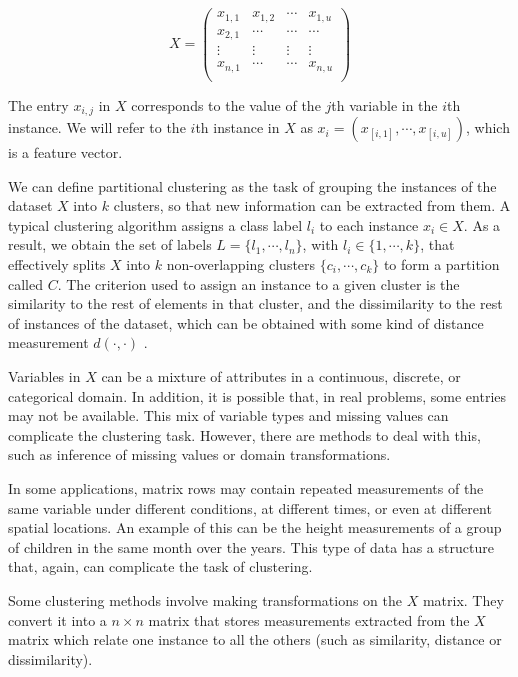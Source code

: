 $$ X = \left( \begin{array}{cccc}

x_{1,1} & x_{1,2} & \cdots & x_{1,u} \\

x_{2,1} & \cdots & \cdots & \cdots  \\

\vdots & \vdots & \vdots & \vdots \\

x_{n,1} & \cdots & \cdots & x_{n,u} \\

\end{array} \right) $$

The entry $x_{i,j}$ in $X$ corresponds to the value of the $j$th variable in the $i$th instance. We will refer to the $i$th instance in $X$ as $x_i = (x_{[i,1]}, \cdots, x_{[i,u]})$, which is a feature vector.

We can define partitional clustering as the task of grouping the instances of the dataset $X$ into $k$ clusters, so that new information can be extracted from them. A typical clustering algorithm assigns a class label $l_i$ to each instance $x_i \in X$. As a result, we obtain the set of labels $L = \{l_1, \cdots, l_n\}$, with $l_i \in \{1, \cdots, k\}$, that effectively splits $X$ into $k$ non-overlapping clusters $\{c_i, \cdots, c_k\}$ to form a partition called $C$. The criterion used to assign an instance to a given cluster is the similarity to the rest of elements in that cluster, and the dissimilarity to the rest of instances of the dataset, which can be obtained with some kind of distance measurement $d(\cdot,\cdot)$ \cite{jain1999data}.

Variables in $X$ can be a mixture of attributes in a continuous, discrete, or categorical domain. In addition, it is possible that, in real problems, some entries may not be available. This mix of variable types and missing values can complicate the clustering task. However, there are methods to deal with this, such as inference of missing values or domain transformations.

In some applications, matrix rows may contain repeated measurements of the same variable under different conditions, at different times, or even at different spatial locations. An example of this can be the height measurements of a group of children in the same month over the years. This type of data has a structure that, again, can complicate the task of clustering.

Some clustering methods involve making transformations on the $X$ matrix. They convert it into a $n \times n$ matrix that stores measurements extracted from the $X$ matrix which relate one instance to all the others (such as similarity, distance or dissimilarity).

